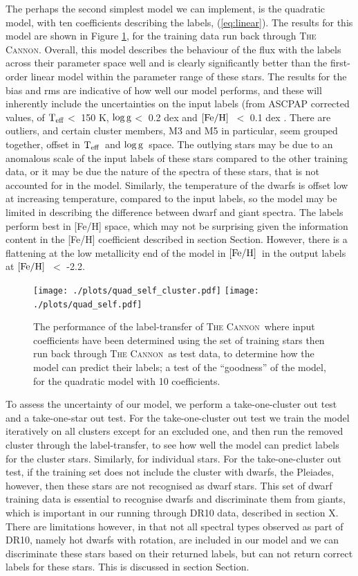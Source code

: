 \documentclass[12pt, preprint]{aastex}
\newcommand{\sectionname}{Section}
\newcommand{\teff}{\mbox{$\rm T_{eff}$}}
\newcommand{\feh}{\mbox{$\rm [Fe/H]$}}
\newcommand{\logg}{\mbox{$\rm \log g$}}
\newcommand{\tc}{\textsc{The Cannon}}
\begin{document}
The perhaps the second simplest model we can implement, is the quadratic model, with ten coefficients describing the labels, (\ref{eq:linear}). The results for this model are shown in Figure \ref{fig:self2}, for the training data run back through \tc. Overall, this model describes the behaviour of the flux with the labels across their parameter space well and is clearly significantly better than the first-order linear model within the parameter range of these stars. The results for the bias and rms are indicative of how well our model performs, and these will inherently include the uncertainties on the input labels (from ASCPAP corrected values, of \teff $<$ 150 K, \logg $<$ 0.2 dex and \feh\ $<$ 0.1 dex \citep{Meszaros2013}. There are outliers, and certain cluster members, M3 and M5 in particular, seem grouped together, offset in \teff\ and \logg\ space. The outlying stars may be due to an anomalous scale of the input labels of these stars compared to the other training data, or it may be due the nature of the spectra of these stars, that is not accounted for in the model. Similarly, the temperature of the dwarfs is offset low at increasing temperature, compared to the input labels, so the model may be limited in describing the difference between dwarf and giant spectra. The labels perform best in [Fe/H] space, which may not be surprising given the information content in the [Fe/H] coefficient described in section \sectionname{}. However, there is a flattening at the low metallicity end of the model in \feh\ in the output labels at \feh\ $<$ -2.2. 


\begin{figure}[h!]
\centering
    \texttt{[image: ./plots/quad\_self\_cluster.pdf]}
  \texttt{[image: ./plots/quad\_self.pdf]}
\caption{The performance of the label-transfer of \tc\, where input coefficients have been determined using the set of training stars then run back through \tc\ as test data, to determine how the model can predict their labels; a test of the ``goodness'' of the model, for the quadratic model with 10 coefficients.}
\label{fig:self2}
\end{figure}

To assess the uncertainty of our model, we perform a take-one-cluster out test and a take-one-star out test. For the take-one-cluster out test we train the model iteratively on all clusters except for an excluded one, and then run the removed cluster through the label-transfer, to see how well the model can predict labels for the cluster stars. Similarly, for individual stars.  For the take-one-cluster out test, if the training set does not include the cluster with dwarfs, the Pleiades, however, then these stars are not recognised as dwarf stars. This set of dwarf training data is essential to recognise dwarfs and discriminate them from giants, which is important in our running through DR10 data, described in section X. There are limitations however, in that not all spectral types observed as part of DR10, namely hot dwarfs with rotation, are included in our model and we can discriminate these stars based on their returned labels, but can not return correct labels for these stars. This is discussed in section \sectionname{}. 
\end{document}
